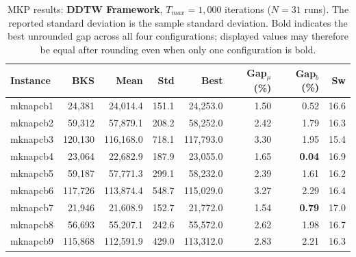 \begin{table}[htbp]
\centering
\caption{MKP results: \textbf{DDTW Framework}, $T_{max} = 1{,}000$ iterations
($N=31$ runs). The reported standard deviation is the sample standard
deviation. Bold indicates the best unrounded gap across all four
configurations; displayed values may therefore be equal after rounding even
when only one configuration is bold.}
\label{tab:mkp_ddtw_1k}
\begin{tabular}{lrrrrrrr}
\toprule
\textbf{Instance} & \textbf{BKS} & \textbf{Mean} & \textbf{Std} & \textbf{Best} & \textbf{Gap$_\mu$ (\%)} & \textbf{Gap$_b$ (\%)} & \textbf{Sw} \\
\midrule
mknapcb1 & 24,381 & 24,014.4 & 151.1 & 24,253.0 & 1.50 & 0.52 & 16.6 \\
mknapcb2 & 59,312 & 57,879.1 & 208.2 & 58,252.0 & 2.42 & 1.79 & 16.3 \\
mknapcb3 & 120,130 & 116,168.0 & 718.1 & 117,793.0 & 3.30 & 1.95 & 15.4 \\
mknapcb4 & 23,064 & 22,682.9 & 187.9 & 23,055.0 & 1.65 & \textbf{0.04} & 16.9 \\
mknapcb5 & 59,187 & 57,771.3 & 299.1 & 58,232.0 & 2.39 & 1.61 & 16.2 \\
mknapcb6 & 117,726 & 113,874.4 & 548.7 & 115,029.0 & 3.27 & 2.29 & 16.4 \\
mknapcb7 & 21,946 & 21,608.9 & 152.7 & 21,772.0 & 1.54 & \textbf{0.79} & 17.0 \\
mknapcb8 & 56,693 & 55,207.1 & 242.6 & 55,572.0 & 2.62 & 1.98 & 16.7 \\
mknapcb9 & 115,868 & 112,591.9 & 429.0 & 113,312.0 & 2.83 & 2.21 & 16.3 \\
\bottomrule
\end{tabular}
\end{table}


